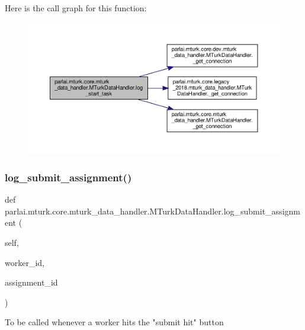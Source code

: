 Here is the call graph for this function\+:
\nopagebreak
\begin{figure}[H]
\begin{center}
\leavevmode
\includegraphics[width=350pt]{classparlai_1_1mturk_1_1core_1_1mturk__data__handler_1_1MTurkDataHandler_a373fe84924d3235c1b461f679c9a0926_cgraph}
\end{center}
\end{figure}
\mbox{\label{classparlai_1_1mturk_1_1core_1_1mturk__data__handler_1_1MTurkDataHandler_a2cebff3c6da14d643bd2bfedce73ba4a}} 
\subsubsection{\texorpdfstring{log\+\_\+submit\+\_\+assignment()}{log\_submit\_assignment()}}
{\footnotesize\ttfamily def parlai.\+mturk.\+core.\+mturk\+\_\+data\+\_\+handler.\+M\+Turk\+Data\+Handler.\+log\+\_\+submit\+\_\+assignment (\begin{DoxyParamCaption}\item[{}]{self,  }\item[{}]{worker\+\_\+id,  }\item[{}]{assignment\+\_\+id }\end{DoxyParamCaption})}

\begin{DoxyVerb}To be called whenever a worker hits the "submit hit" button\end{DoxyVerb}
 

